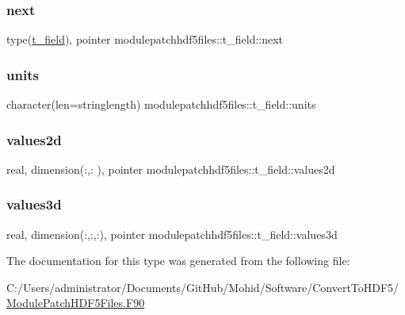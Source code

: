 \subsubsection{\texorpdfstring{next}{next}}
{\footnotesize\ttfamily type(\mbox{\hyperlink{structmodulepatchhdf5files_1_1t__field}{t\+\_\+field}}), pointer modulepatchhdf5files\+::t\+\_\+field\+::next\hspace{0.3cm}{\ttfamily [private]}}

\mbox{\label{structmodulepatchhdf5files_1_1t__field_ac5c760ce0b7c827fe59eadfaadcaafff}} 
\subsubsection{\texorpdfstring{units}{units}}
{\footnotesize\ttfamily character(len=stringlength) modulepatchhdf5files\+::t\+\_\+field\+::units\hspace{0.3cm}{\ttfamily [private]}}

\mbox{\label{structmodulepatchhdf5files_1_1t__field_a817bf9bb3daa21251d195c35310d83ad}} 
\subsubsection{\texorpdfstring{values2d}{values2d}}
{\footnotesize\ttfamily real, dimension(\+:,\+:  ), pointer modulepatchhdf5files\+::t\+\_\+field\+::values2d\hspace{0.3cm}{\ttfamily [private]}}

\mbox{\label{structmodulepatchhdf5files_1_1t__field_a55c50dcedff1e9f981e814bdff7385bb}} 
\subsubsection{\texorpdfstring{values3d}{values3d}}
{\footnotesize\ttfamily real, dimension(\+:,\+:,\+:), pointer modulepatchhdf5files\+::t\+\_\+field\+::values3d\hspace{0.3cm}{\ttfamily [private]}}



The documentation for this type was generated from the following file\+:\begin{DoxyCompactItemize}
\item 
C\+:/\+Users/administrator/\+Documents/\+Git\+Hub/\+Mohid/\+Software/\+Convert\+To\+H\+D\+F5/\mbox{\hyperlink{_module_patch_h_d_f5_files_8_f90}{Module\+Patch\+H\+D\+F5\+Files.\+F90}}\end{DoxyCompactItemize}
